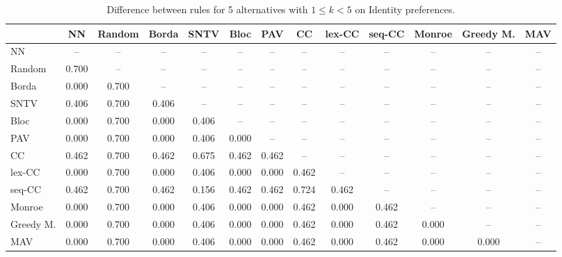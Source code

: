 
\begin{table*}[h!]
\centering
\begin{tabular}{lcccccccccccc}
\toprule
 & NN & Random & Borda & SNTV & Bloc & PAV & CC & lex-CC & seq-CC & Monroe & Greedy M. & MAV \\
\midrule
NN & -- & -- & -- & -- & -- & -- & -- & -- & -- & -- & -- & -- \\
Random & 0.700 & -- & -- & -- & -- & -- & -- & -- & -- & -- & -- & -- \\
Borda & 0.000 & 0.700 & -- & -- & -- & -- & -- & -- & -- & -- & -- & -- \\
SNTV & 0.406 & 0.700 & 0.406 & -- & -- & -- & -- & -- & -- & -- & -- & -- \\
Bloc & 0.000 & 0.700 & 0.000 & 0.406 & -- & -- & -- & -- & -- & -- & -- & -- \\
PAV & 0.000 & 0.700 & 0.000 & 0.406 & 0.000 & -- & -- & -- & -- & -- & -- & -- \\
CC & 0.462 & 0.700 & 0.462 & 0.675 & 0.462 & 0.462 & -- & -- & -- & -- & -- & -- \\
lex-CC & 0.000 & 0.700 & 0.000 & 0.406 & 0.000 & 0.000 & 0.462 & -- & -- & -- & -- & -- \\
seq-CC & 0.462 & 0.700 & 0.462 & 0.156 & 0.462 & 0.462 & 0.724 & 0.462 & -- & -- & -- & -- \\
Monroe & 0.000 & 0.700 & 0.000 & 0.406 & 0.000 & 0.000 & 0.462 & 0.000 & 0.462 & -- & -- & -- \\
Greedy M. & 0.000 & 0.700 & 0.000 & 0.406 & 0.000 & 0.000 & 0.462 & 0.000 & 0.462 & 0.000 & -- & -- \\
MAV & 0.000 & 0.700 & 0.000 & 0.406 & 0.000 & 0.000 & 0.462 & 0.000 & 0.462 & 0.000 & 0.000 & -- \\
\bottomrule
\end{tabular}

\caption{Difference between rules for 5 alternatives with $1 \leq k < 5$ on Identity preferences.}
\end{table*}

